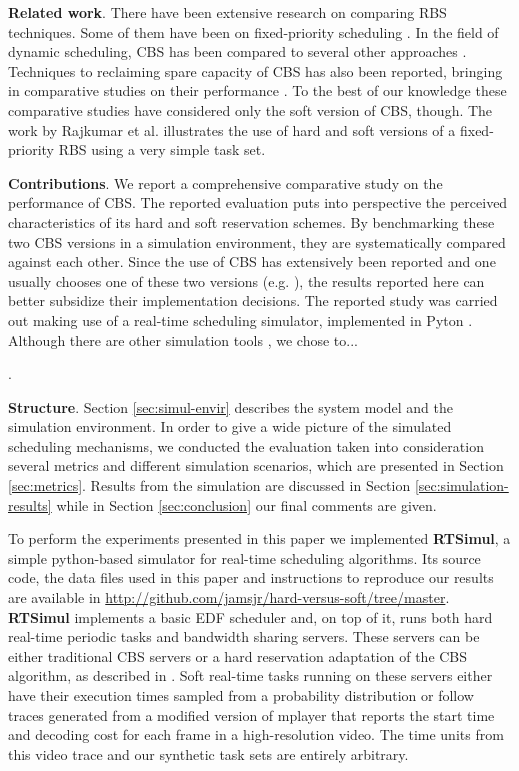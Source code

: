 \documentclass[times, 10pt,twocolumn]{article}
\newcounter{notecounter}
\newcommand{\nota}[1]{\addtocounter{notecounter}{1}{\textcolor{red}{[nota
      \arabic{notecounter}: #1]}}}
\newcommand{\simul}{\textbf{RTSimul}} %
\begin{document}
\textbf{Related work}. There have been extensive research on comparing
RBS techniques.  Some of them have been on fixed-priority scheduling
\cite{BB99,BB02,DB05,DW95}.  In the field of dynamic scheduling, CBS
has been compared to several other approaches
\cite{spuri.ea96:scheduling}.  Techniques to reclaiming spare capacity
of CBS has also been reported, bringing in comparative studies on
their performance \cite{caccamo.ea00:capacity,lin.ea05:improving}. To
the best of our knowledge these comparative studies have considered
only the soft version of CBS, though.  The work by Rajkumar et
al. \cite{rajkumar.ea01:resource} illustrates the use of hard and soft
versions of a fixed-priority RBS using a very simple task set.

\textbf{Contributions}. We report a comprehensive comparative study on
the performance of CBS. The reported evaluation puts into perspective
the perceived characteristics of its hard and soft reservation
schemes.  By benchmarking these two CBS versions in a simulation
environment, they are systematically compared against each other.
Since the use of CBS has extensively been reported and one usually
chooses one of these two versions
(e.g. \cite{abeni.ea99:adaptive,abeni.ea05:qos}), the results reported
here can better subsidize their implementation decisions.  The
reported study was carried out making use of a real-time scheduling
simulator, implemented in Pyton \cite{PRSIM}. Although there are other
simulation tools \cite{simTools}, we chose to... \nota{justificar a
  implementacao de um novo simulador}.

\textbf{Structure}. Section \ref{sec:simul-envir} describes the system
model and the simulation environment.  In order to give a wide picture
of the simulated scheduling mechanisms, we conducted the evaluation
taken into consideration several metrics and different simulation
scenarios, which are presented in Section \ref{sec:metrics}. Results
from the simulation are discussed in Section
\ref{sec:simulation-results} while in Section \ref{sec:conclusion} our
final comments are given.

\label{sec:simul-envir}

To perform the experiments presented in this paper we implemented
\simul{}, a simple python-based simulator for real-time scheduling
algorithms. Its source code, the data files used in this paper and
instructions to reproduce our results are available in
\url{http://github.com/jamsjr/hard-versus-soft/tree/master}. \simul{}
implements a basic EDF scheduler and, on top of it, runs both hard
real-time periodic tasks and bandwidth sharing servers. These servers
can be either traditional CBS servers \cite{abeni.ea98:integrating} or
a hard reservation adaptation of the CBS algorithm, as described in
\cite{buttazzo05:soft}. Soft real-time tasks running on these servers
either have their execution times sampled from a probability
distribution or follow traces generated from a modified version of
mplayer that reports the start time and decoding cost for each frame
in a high-resolution video. The time units from this video trace and
our synthetic task sets are entirely arbitrary.
\end{document}
